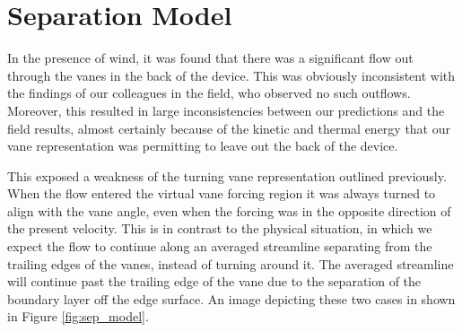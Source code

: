 


\section{Separation Model}
\label{sec:separation}

In the presence of wind, it was found that there was a significant flow
out through the vanes in the back of the device. This was obviously
inconsistent with the findings of our colleagues in the field, who
observed no such outflows. Moreover, this resulted
in large inconsistencies between our predictions and the field results,
almost certainly because of the kinetic and thermal energy that our vane
representation was permitting to leave out the back of the device.  

This exposed a weakness of the turning vane representation outlined
previously. When the flow entered the virtual vane forcing region it was
always turned to align with the vane angle, even when the forcing was in
the opposite direction of the present velocity.
This is in contrast to the physical situation, in which we
expect the flow to continue along an averaged streamline separating from the 
trailing edges of the vanes, instead of turning around it. 
The averaged streamline will continue past the trailing edge of the vane
due to the separation of the boundary layer off the edge surface. An
image depicting these two cases in shown in Figure \ref{fig:sep_model}.  

